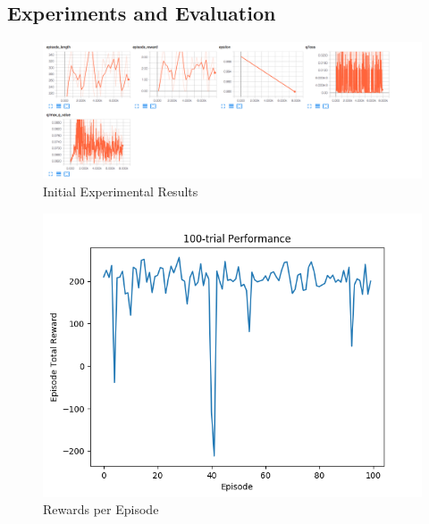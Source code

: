 \subsection{Experiments and Evaluation}

\begin{figure}%
\centering
\includegraphics[width=0.8\columnwidth]{figures/tensorboard.png}%
\caption{Initial Experimental Results}%
\label{fig:datastats}%
\end{figure}





\begin{figure}%
\centering
\includegraphics[width=0.6\columnwidth]{figures/evaluate_100.png}%
\caption{Rewards per Episode}%
\label{fig:datastats}%
\end{figure}


